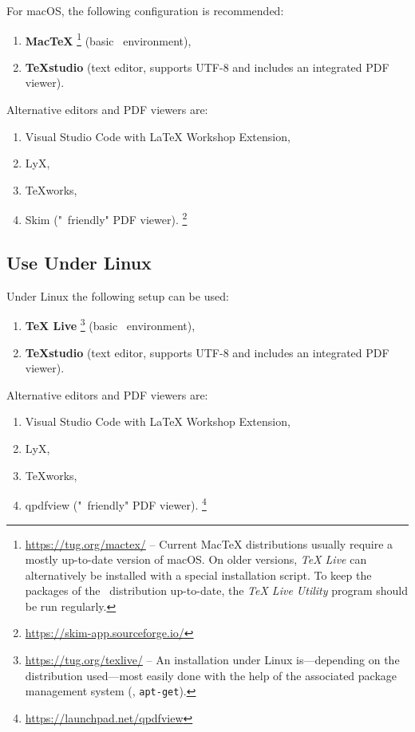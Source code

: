 For macOS, the following configuration is recommended:
%
\begin{enumerate}
\item 
	\textbf{MacTeX}%
	\footnote{\url{https://tug.org/mactex/} -- 
	Current MacTeX distributions usually require a mostly up-to-date version of macOS. 
	On older versions, \emph{TeX Live} can alternatively be installed with a special
	installation script. To keep the packages of the \latex\ distribution up-to-date, the 
	\emph{TeX Live Utility} program should be run regularly.}
	(basic \latex\ environment),
\item \textbf{TeXstudio} (text editor, supports UTF-8 and includes an integrated PDF viewer).
\end{enumerate}
%
Alternative editors and PDF viewers are:
%
\begin{enumerate}
	\item Visual Studio Code with LaTeX Workshop Extension,%
	\item LyX,%
	\item TeXworks,%
	\item Skim ("\latex\ friendly" PDF viewer).%
	\footnote{\url{https://skim-app.sourceforge.io/}}
\end{enumerate}


\subsection{Use Under Linux}

Under Linux the following setup can be used:
%
\begin{enumerate}
	\item 
	\textbf{TeX Live}%
	\footnote{\url{https://tug.org/texlive/} -- An installation under Linux is---depending
	on the distribution used---most easily done with the help of the associated package
	management system (\eg, \texttt{apt-get}).}
	(basic \latex\ environment),
	\item \textbf{TeXstudio} (text editor, supports UTF-8 and includes an
	integrated PDF viewer).
\end{enumerate}
%
Alternative editors and PDF viewers are:
%
\begin{enumerate}
	\item Visual Studio Code with LaTeX Workshop Extension,%
	\item LyX,%
	\item TeXworks,%
	\item qpdfview ("\latex\ friendly" PDF viewer).%
	\footnote{\url{https://launchpad.net/qpdfview}}
\end{enumerate}


